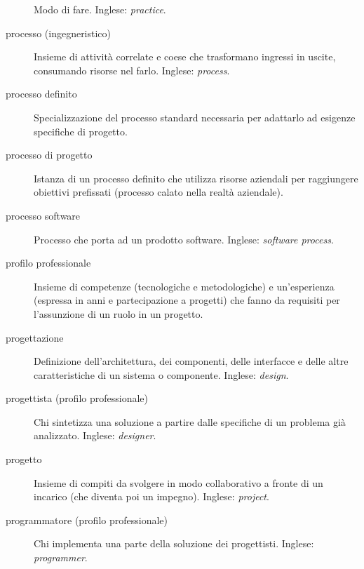 \documentclass[a4paper]{article}
\begin{document}
\begin{description}
			Modo di fare. Inglese: \emph{practice}.
			
	\item[processo (ingegneristico)] 

			Insieme di attività correlate e coese che trasformano ingressi in uscite, consumando risorse nel farlo. Inglese: \emph{process}.
			
	\item[processo definito] 

			Specializzazione del processo standard necessaria per adattarlo ad esigenze specifiche di progetto.
			
	\item[processo di progetto] 

			Istanza di un processo definito che utilizza risorse aziendali per raggiungere obiettivi prefissati (processo calato nella realtà aziendale).
			
	\item[processo software] 

			Processo che porta ad un prodotto software. Inglese: \emph{software process}.
			
	\item[profilo professionale] 

			Insieme di competenze (tecnologiche e metodologiche) e un'esperienza (espressa in anni e partecipazione a progetti) che fanno da requisiti per l'assunzione di un ruolo in un progetto.
			
	\item[progettazione] 

			Definizione dell'architettura, dei componenti, delle interfacce e delle altre caratteristiche di un sistema o componente. Inglese: \emph{design}.
			
	\item[progettista (profilo professionale)] 

			Chi sintetizza una soluzione a partire dalle specifiche di un problema già analizzato. Inglese: \emph{designer}.
			
	\item[progetto] 

			Insieme di compiti da svolgere in modo collaborativo a fronte di un incarico (che diventa poi un impegno). Inglese: \emph{project}.
			
	\item[programmatore (profilo professionale)] 

			Chi implementa una parte della soluzione dei progettisti. Inglese: \emph{programmer}.
			

\end{description}
\end{document}
